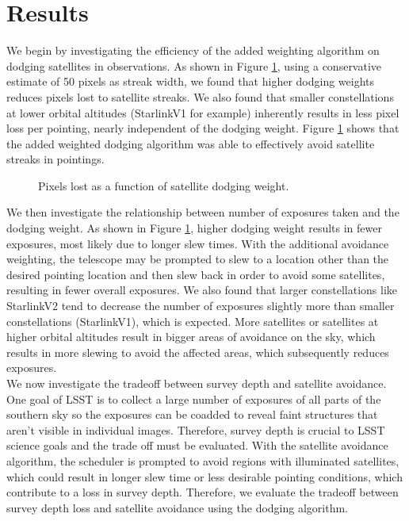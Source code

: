 \documentclass[linenumbers]{aastex631}
\begin{document}
\section{Results}
We begin by investigating the efficiency of the added weighting algorithm on dodging
satellites in observations. As shown in Figure \ref{fig-pixel-loss-weight}, using a conservative estimate of 50 pixels as
streak width, we found that higher dodging weights reduces pixels lost to satellite streaks. We
also found that smaller constellations at lower orbital altitudes (StarlinkV1 for example)
inherently results in less pixel loss per pointing, nearly independent of the dodging weight.
Figure \ref{fig-pixel-loss-weight} shows that the added weighted dodging algorithm was able to effectively avoid satellite streaks in pointings.

\begin{figure}[ht!]
%
\caption{Pixels lost as a function of satellite dodging weight. \label{fig-pixel-loss-weight}}
\end{figure}

We then investigate the relationship between number of exposures taken and the dodging
weight. As shown in Figure \ref{fig-pixel-loss-weight}, higher dodging weight results in fewer exposures, most likely due
to longer slew times. With the additional avoidance weighting, the telescope may be prompted to
slew to a location other than the desired pointing location and then slew back in order to avoid
some satellites, resulting in fewer overall exposures. We also found that larger constellations like
StarlinkV2 tend to decrease the number of exposures slightly more than smaller constellations
(StarlinkV1), which is expected. More satellites or satellites at higher orbital altitudes result in
bigger areas of avoidance on the sky, which results in more slewing to avoid the affected areas,
which subsequently reduces exposures. \\

We now investigate the tradeoff between survey depth and satellite avoidance. One goal of LSST is to collect a large number of exposures of all parts of the southern sky so the
exposures can be coadded to reveal faint structures that aren’t visible in individual images.
Therefore, survey depth is crucial to LSST science goals and the trade off must be evaluated.
With the satellite avoidance algorithm, the scheduler is prompted to avoid regions with
illuminated satellites, which could result in longer slew time or less desirable pointing
conditions, which contribute to a loss in survey depth. Therefore, we evaluate the tradeoff
between survey depth loss and satellite avoidance using the dodging algorithm.\\
\end{document}
